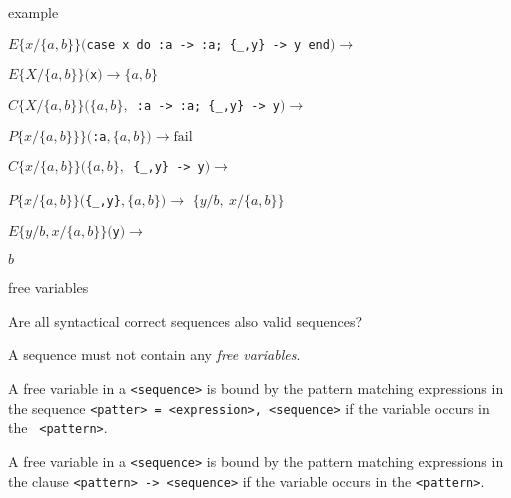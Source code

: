 \begin{frame}{example}

\begin{eval}
  \pause$E\lbrace x/\lbrace a,b\rbrace\rbrace(${\tt case x do :a -> :a; \{\_,y\} -> y end}$) \rightarrow$ 
\end{eval}

\begin{eval}
   \hspace{40pt}\pause$E\lbrace X/\lbrace a,b\rbrace\rbrace(${\tt x}$) \rightarrow \lbrace a,b\rbrace$
\end{eval}

\begin{eval}
   \pause $C\lbrace X/\lbrace a,b\rbrace\rbrace(\lbrace a,b\rbrace, ${\tt \ :a -> :a; \{\_,y\} -> y}$) \rightarrow$ 
\end{eval}
\begin{eval}
   \hspace{40pt}\pause $P\lbrace x/\lbrace a,b\rbrace\rbrace\rbrace( ${\tt :a}$, \lbrace a,b\rbrace) \rightarrow \mathrm{fail}$
\end{eval}

\begin{eval}
   \pause $C\lbrace x/\lbrace a,b\rbrace\rbrace(\lbrace a,b\rbrace, ${\tt \  \{\_,y\} -> y}$) \rightarrow$ 
\end{eval}
\begin{eval}
   \hspace{40pt}\pause $P\lbrace x/\lbrace a,b\rbrace\rbrace(${\tt \{\_,y\}}$, \lbrace a,b\rbrace) \rightarrow $ \pause $\lbrace y/b,\  x/\lbrace a,b\rbrace\rbrace$
\end{eval}

\begin{eval}
  \pause$E\lbrace y/b, x/\lbrace a,b\rbrace\rbrace(${\tt y}$) \rightarrow $
\end{eval}
\begin{eval}
  \hspace{40pt}\pause$b$
\end{eval}
  
\end{frame}


\begin{frame}{free variables}

Are all syntactical correct sequences also valid sequences?

\pause\vspace{20pt}

A sequence must not contain any {\em free variables}.

\pause\vspace{10pt}

A free variable in a {\tt <sequence>} is bound by the
pattern matching expressions in the sequence {\tt <patter> =
<expression>, <sequence>} if the variable occurs in the {\tt
<pattern>}.

\pause\vspace{10pt}

A free variable in a {\tt <sequence>} is bound by the pattern matching
expressions in the clause {\tt <pattern> -> <sequence>} if the
variable occurs in the {\tt <pattern>}.


\end{frame}

